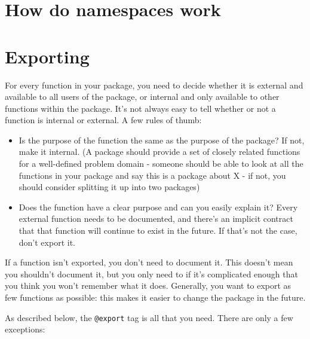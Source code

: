\section{How do namespaces work}

\section{Exporting}

For every function in your package, you need to decide whether it is
external and available to all users of the package, or internal and only
available to other functions within the package. It's not always easy to
tell whether or not a function is internal or external. A few rules of
thumb:

\begin{itemize}
\item
  Is the purpose of the function the same as the purpose of the package?
  If not, make it internal. (A package should provide a set of closely
  related functions for a well-defined problem domain - someone should
  be able to look at all the functions in your package and say this is a
  package about X - if not, you should consider splitting it up into two
  packages)
\item
  Does the function have a clear purpose and can you easily explain it?
  Every external function needs to be documented, and there's an
  implicit contract that that function will continue to exist in the
  future. If that's not the case, don't export it.
\end{itemize}

If a function isn't exported, you don't need to document it. This
doesn't mean you shouldn't document it, but you only need to if it's
complicated enough that you think you won't remember what it does.
Generally, you want to export as few functions as possible: this makes
it easier to change the package in the future.

As described below, the \texttt{@export} tag is all that you need. There
are only a few exceptions:

